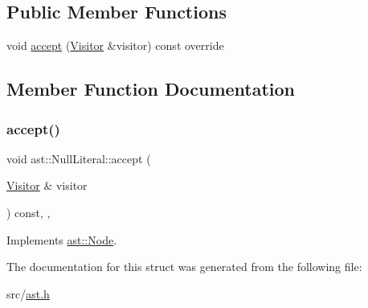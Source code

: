 \subsection*{Public Member Functions}
\begin{DoxyCompactItemize}
\item 
void \hyperlink{structast_1_1_null_literal_add571a164187f3eac4e970809a8a953b}{accept} (\hyperlink{structast_1_1_visitor}{Visitor} \&visitor) const override
\end{DoxyCompactItemize}


\subsection{Member Function Documentation}
\mbox{\label{structast_1_1_null_literal_add571a164187f3eac4e970809a8a953b}} 
\subsubsection{\texorpdfstring{accept()}{accept()}}
{\footnotesize\ttfamily void ast\+::\+Null\+Literal\+::accept (\begin{DoxyParamCaption}\item[{\hyperlink{structast_1_1_visitor}{Visitor} \&}]{visitor }\end{DoxyParamCaption}) const\hspace{0.3cm}{\ttfamily [inline]}, {\ttfamily [override]}, {\ttfamily [virtual]}}



Implements \hyperlink{structast_1_1_node_abc089ee6caaf06a4445ebdd8391fdebc}{ast\+::\+Node}.



The documentation for this struct was generated from the following file\+:\begin{DoxyCompactItemize}
\item 
src/\hyperlink{ast_8h}{ast.\+h}\end{DoxyCompactItemize}
